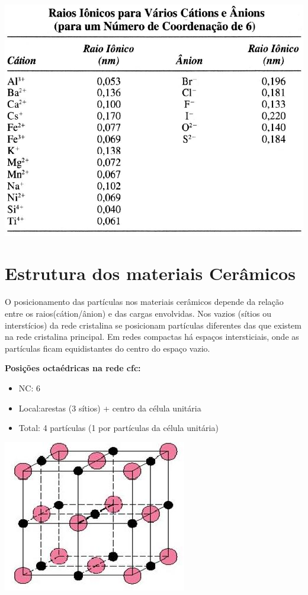  
 \includegraphics[scale=0.2,trim={0 0 0 0}]{figures/raio}
 

 \section{Estrutura dos materiais Cerâmicos}
 
O posicionamento das partículas nos materiais cerâmicos depende da relação entre os raios(cátion/ânion) e das cargas envolvidas. Nos vazios (sítios ou interstícios) da rede cristalina se posicionam partículas diferentes das que existem na rede cristalina principal. Em redes compactas há espaços intersticiais, onde as partículas ficam equidistantes do centro do espaço vazio.
 

\textbf{Posições octaédricas na rede cfc:}

 \begin{itemize}
 	
 	\setlength{\parskip}{0pt}
 	\setlength{\itemsep}{0pt plus 1pt}
 	
 	\item NC: 6
 	\item Local:arestas (3 sítios) + centro da célula unitária
 	\item Total: 4 partículas (1 por partículas da célula unitária)
 \end{itemize}

 \includegraphics[scale=0.5,trim={0 0 0 0}]{figures/occfc}
 

